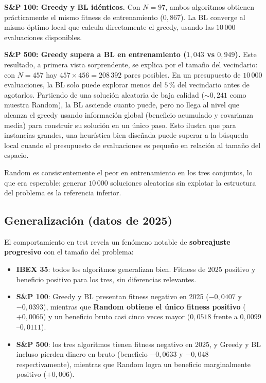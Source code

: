 \documentclass[12pt,a4paper]{article}
\begin{document}
\textbf{S\&P 100: Greedy y BL idénticos.}
Con $N=97$, ambos algoritmos obtienen prácticamente el mismo fitness de entrenamiento ($0{,}867$).
La BL converge al mismo óptimo local que calcula directamente el greedy, usando las
$10\,000$ evaluaciones disponibles.

\textbf{S\&P 500: Greedy supera a BL en entrenamiento ($1{,}043$ vs $0{,}949$).}
Este resultado, a primera vista sorprendente, se explica por el tamaño del
vecindario: con $N=457$ hay $457 \times 456 = 208\,392$ pares posibles.
En un presupuesto de $10\,000$ evaluaciones, la BL solo puede explorar menos
del $5\,\%$ del vecindario antes de agotarlos.
Partiendo de una solución aleatoria de baja calidad ($\sim 0{,}241$ como
muestra Random), la BL asciende cuanto puede, pero no llega al nivel que
alcanza el greedy usando información global (beneficio acumulado y covarianza
media) para construir su solución en un único paso.
Esto ilustra que para instancias grandes, una heurística bien diseñada puede
superar a la búsqueda local cuando el presupuesto de evaluaciones es pequeño
en relación al tamaño del espacio.

Random es consistentemente el peor en entrenamiento en los tres conjuntos,
lo que era esperable: generar $10\,000$ soluciones aleatorias sin explotar la
estructura del problema es la referencia inferior.

\subsection{Generalización (datos de 2025)}

El comportamiento en test revela un fenómeno notable de \textbf{sobreajuste
progresivo} con el tamaño del problema:

\begin{itemize}
  \item \textbf{IBEX 35}: todos los algoritmos generalizan bien.
    Fitness de 2025 positivo y beneficio positivo para los tres, sin diferencias relevantes.

  \item \textbf{S\&P 100}: Greedy y BL presentan fitness negativo en 2025
    ($-0{,}0407$ y $-0{,}0393$), mientras que \textbf{Random obtiene el único
    fitness positivo} ($+0{,}0065$) y un beneficio bruto casi
    cinco veces mayor ($0{,}0518$ frente a $0{,}0099$--$0{,}0111$).

  \item \textbf{S\&P 500}: los tres algoritmos tienen fitness negativo en 2025,
    y Greedy y BL incluso pierden dinero en bruto (beneficio $-0{,}0633$ y
    $-0{,}048$ respectivamente), mientras que Random logra un beneficio
    marginalmente positivo ($+0{,}006$).
\end{itemize}
\end{document}
